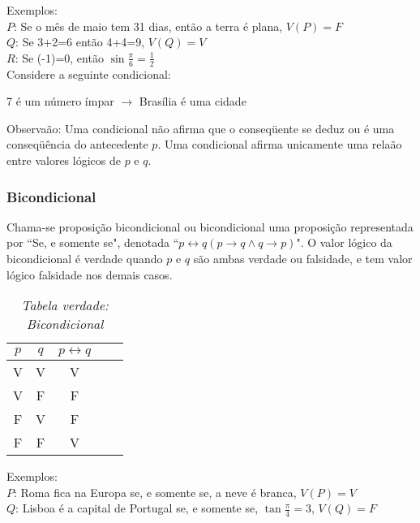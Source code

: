Exemplos:\\
\textbf{$P$}: Se o mês de maio tem 31 dias, então a terra é plana, $V(P)=F$\\
\textbf{$Q$}: Se 3+2=6 então 4+4=9, $V(Q)=V$\\
\textbf{$R$}: Se (-1)=0, então $\sin\displaystyle\frac{\pi}{6}=\displaystyle\frac{1}{2}$\\

Considere a seguinte condicional:
\begin{center}
7 é um número ímpar $\rightarrow$ Brasília é uma cidade
\end{center}

Observaão: Uma condicional não afirma que o conseqüente se deduz ou é uma conseqüência do antecedente $p$. Uma condicional afirma unicamente uma relaão entre valores lógicos de $p$ e $q$.

\subsubsection{Bicondicional}

\begin{definicao}[Bicondicional] Chama-se proposição bicondicional ou bicondicional uma proposição representada por ``Se, e somente se", denotada ``$p\leftrightarrow q(p\rightarrow q\wedge q\rightarrow p)$". O valor lógico da bicondicional é verdade quando $p$ e $q$ são ambas verdade ou falsidade, e tem valor lógico falsidade nos demais casos.\end{definicao}
\begin{table}[h]
   \centering
   \setlength{\arrayrulewidth}{0,5\arrayrulewidth}
   \caption{\it Tabela verdade: Bicondicional}
   \begin{tabular}{|c|c|c|c|c|}
      \hline
      $p$ & $q$ & $p\leftrightarrow q$ \\
     \hline
      V & V & V \\
      \hline
      V & F & F \\
      \hline
      F & V & F \\
      \hline
      F & F & V \\
      \hline
   \end{tabular}
\end{table}

Exemplos:\\
\textbf{$P$}: Roma fica na Europa se, e somente se, a neve é branca, $V(P)=V$\\
\textbf{$Q$}: Lisboa é a capital de Portugal se, e somente se, $\tan\displaystyle\frac{\pi}{4}=3$, $V(Q)=F$
